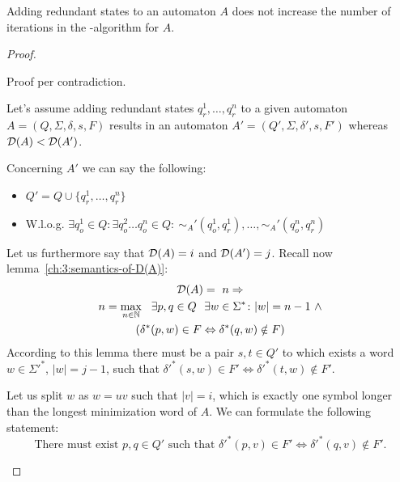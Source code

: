 \begin{theorem}[]
	Adding redundant states to an automaton $A$ does not increase the number of iterations in the \CompDist-algorithm for $A$.
\end{theorem}

\begin{proof}
	\begin{description}
		\item
		
		Proof per contradiction.
		
		Let's assume adding redundant states $q_r^1, \ldots, q_r^n$ to a given automaton $A = (Q, \Sigma, \delta, s, F)$ results in an automaton $A' = (Q', \Sigma, \delta', s, F')$ whereas $\mathcal{D}(A) < \mathcal{D}(A')$.
		
		Concerning $A'$ we can say the following:
		\begin{itemize}
			\item $Q' = Q \cup \{ q_r^1, \ldots, q_r^n \}$
			\item W.l.o.g. $\exists q_o^1 \in Q \colon \exists q_o^2 \ldots q_o^n \in Q \colon\ \sim_A'(q_o^1, q_r^1), \ldots, \sim_A'(q_o^n, q_r^n)$
		\end{itemize}
		Let us furthermore say that $\mathcal{D}(A) = i$ and $\mathcal{D}(A') = j$. Recall now lemma~\ref{ch:3:semantics-of-D(A)}:
		\begin{multline*}
		\mathcal{D}(A) =\ n \Rightarrow \\
		n = \max_{n \in \mathbb{N}}\ \ \exists p, q \in Q\ \ \exists w \in \Sigma^* \colon |w| = n - 1\ \land \\
		(\delta^*(p,w) \in F \Leftrightarrow \delta^*(q,w) \notin F)
		\end{multline*}
		According to this lemma there must be a pair $s, t \in Q'$ to which exists a word $w \in \Sigma'^*$, $|w| = j - 1$, such that $\delta'^*(s,w) \in F' \Leftrightarrow \delta'^*(t,w) \notin F'$.
		
		Let us split $w$ as $w = uv$ such that $|v| = i$, which is exactly one symbol longer than the longest minimization word of $A$. We can formulate the following statement:
		\begin{equation}
		\text{There must exist }p, q \in Q'\text{ such that }\delta'^*(p,v) \in F' \Leftrightarrow \delta'^*(q,v) \notin F'.
		\end{equation}
		

\end{description}
\end{proof}
